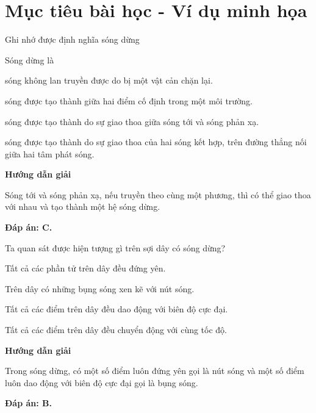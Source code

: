 \section{Mục tiêu bài học - Ví dụ minh họa}
\begin{dang}{Ghi nhớ được định nghĩa sóng dừng}
	{Sóng dừng là
		\begin{mcq}
			\item sóng không lan truyền được do bị một vật cản chặn lại.
			\item sóng được tạo thành giữa hai điểm cố định trong một môi trường.
			\item sóng được tạo thành do sự giao thoa giữa sóng tới và sóng phản xạ.
			\item sóng được tạo thành do sự giao thoa của hai sóng kết hợp, trên đường thẳng nối giữa hai tâm phát sóng.
		\end{mcq}
	}
	{
		\begin{center}
			\textbf{Hướng dẫn giải}
		\end{center}
		
		Sóng tới và sóng phản xạ, nếu truyền theo cùng một phương, thì có thể giao thoa với nhau và tạo thành một hệ sóng dừng.
		
		\textbf{Đáp án: C.}
	}
	{Ta quan sát được hiện tượng gì trên sợi dây có sóng dừng?
		
		\begin{mcq}
			\item Tất cả các phần tử trên dây đều đứng yên.
			\item Trên dây có những bụng sóng xen kẽ với nút sóng.
			\item Tất cả các điểm trên dây đều dao động với biên độ cực đại.
			\item Tất cả các điểm trên dây đều chuyển động với cùng tốc độ.
		\end{mcq}
	}
	{\begin{center}
			\textbf{Hướng dẫn giải}
		\end{center}
		
		Trong sóng dừng, có một số điểm luôn đứng yên gọi là nút sóng và một số điểm luôn dao động với biên độ cực đại gọi là bụng sóng.
		
		\textbf{Đáp án: B.}
	}
\end{dang}
